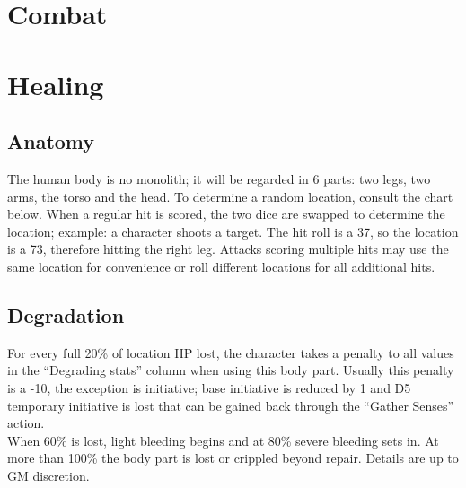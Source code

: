 \documentclass[12pt,a4paper,openany]{book}
\begin{document}
	\chapter{Combat}
	
	
	
	
	
	\chapter{Healing}
	\section{Anatomy}
	The human body is no monolith; it will be regarded in 6 parts: two legs, two arms, the torso and the head. To determine a random location, consult the chart below. When a regular hit is scored, the two dice are swapped to determine the location; example: a character shoots a target. The hit roll is a 37, so the location is a 73, therefore hitting the right leg. Attacks scoring multiple hits may use the same location for convenience or roll different locations for all additional hits.
	\section{Degradation}
	For every full 20\% of location HP lost, the character takes a penalty to all values in the “Degrading stats” column when using this body part. Usually this penalty is a -10, the exception is initiative; base initiative is reduced by 1 and D5 temporary initiative is lost that can be gained back through the “Gather Senses” action.\\
	When 60\% is lost, light bleeding begins and at 80\% severe bleeding sets in. At more than 100\% the body part is lost or crippled beyond repair. Details are up to GM discretion.
\end{document}
